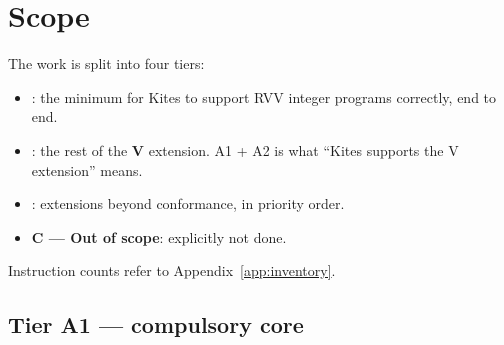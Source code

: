 \documentclass[11pt]{article}
\begin{document}
\section{Scope}\label{sec:scope}

The work is split into four tiers:

\begin{itemize}
\item {}: the minimum for Kites to support RVV integer programs correctly,
  end to end.
\item {}: the rest of the \textbf{V} extension. A1 + A2 is
  what ``Kites supports the V extension'' means.
\item {}: extensions beyond conformance, in priority order.
\item \textsf{\textbf{\color{kgrey}C --- Out of scope}}: explicitly not done.
\end{itemize}

Instruction counts refer to Appendix~\ref{app:inventory}.

\subsection{Tier A1 --- compulsory core}
\end{document}
